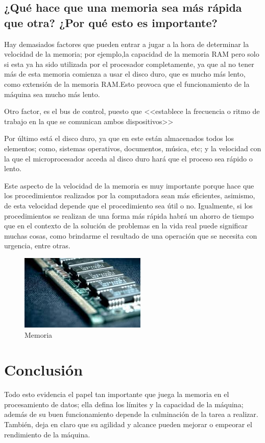 \documentclass{article}
\begin{document}
\subsection{¿Qué hace que una memoria sea más rápida que otra? ¿Por qué esto es importante?}\par
Hay demasiados factores que pueden entrar a jugar a la hora de determinar la velocidad de la memoria; por ejemplo,la capacidad de la memoria RAM pero solo si esta ya ha sido utilizada por el procesador completamente, ya que al no tener más de esta memoria comienza a usar el disco duro, que es mucho más lento, como extensión de la memoria RAM.Esto provoca que el funcionamiento de la máquina sea mucho más lento.\par
Otro factor, es el bus de control, puesto que <<establece la frecuencia o ritmo de trabajo en la que se comunican ambos dispositivos>>\cite{Salazar} \par
Por último está el disco duro, ya que en este están almacenados todos los elementos; como, sistemas operativos, documentos, música, etc; y la velocidad con la que el microprocesador acceda al disco duro hará que el proceso sea rápido o lento.\cite{El_Comercio}\par
Este aspecto de la velocidad de la memoria es muy importante porque hace que los procedimientos realizados por la computadora sean más eficientes, asimismo, de esta velocidad depende que el procedimiento sea útil o no. Igualmente, si los procedimientos se realizan de una forma más rápida habrá un ahorro de tiempo que en el contexto de la solución de problemas en la vida real puede significar muchas cosas, como brindarme el resultado de una operación que se necesita con urgencia, entre otras.\par

\begin{figure}[h]
\includegraphics[width=6cm]{descarga.png}
\centering
\caption{Memoria}
\label{fig:cpplogo}
\end{figure}


\section{Conclusión} \label{conclulsion}
Todo esto evidencia el papel tan importante que juega la memoria en el procesamiento de datos; ella defina los límites y la capacidad de la máquina; además de su buen funcionamiento depende la culminación de la tarea a realizar. También, deja en claro que su agilidad y alcance pueden mejorar o empeorar el rendimiento de la máquina.



\end{document}
